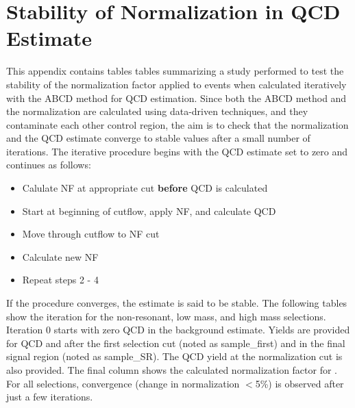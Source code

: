 \chapter{Stability of \ttbar Normalization in QCD Estimate}
\label{app:qcd_ttbarNFstability_appendix}

This appendix contains tables tables summarizing a study performed to test the stability of the normalization factor applied to \ttbar events when calculated iteratively with the ABCD method for QCD estimation. Since both the ABCD method and the \ttbar normalization are calculated using data-driven techniques, and they contaminate each other control region, the aim is to check that  the \ttbar normalization and the QCD estimate converge to stable values after a small number of iterations. The iterative procedure begins with the QCD estimate set to zero and continues as follows:
\begin{itemize}
\item Calulate \ttbar NF at appropriate cut \textbf{before} QCD is calculated
\item Start at beginning of cutflow, apply \ttbar NF, and calculate QCD
\item Move through cutflow to \ttbar NF cut
\item Calculate new \ttbar NF
\item Repeat steps 2 - 4
\end{itemize}
If the procedure converges, the estimate is said to be stable. The following tables show the iteration for the non-resonant, low mass, and high mass selections. Iteration 0 starts with zero QCD in the background estimate. Yields are provided for QCD and \ttbar after the first selection cut (noted as sample\_first) and in the final \mbb signal region (noted as sample\_SR). The QCD yield at the \ttbar normalization cut is also provided. The final column shows the calculated normalization factor for \ttbar. For all selections, convergence (change in \ttbar normalization $<$5\%) is observed after just a few iterations. 
